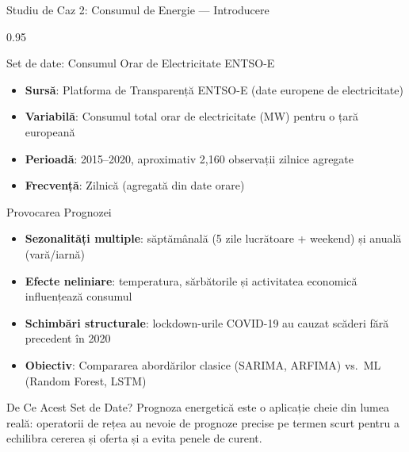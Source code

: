 \documentclass[9pt, aspectratio=169, t]{beamer}
\begin{document}
\begin{frame}{Studiu de Caz 2: Consumul de Energie --- Introducere}
    \begin{cminipage}{0.95\textwidth}
    \vspace{-2mm}
    \begin{block}{Set de date: Consumul Orar de Electricitate ENTSO-E}
        {\small
        \begin{itemize}\setlength{\itemsep}{1pt}
            \item \textbf{Sursă}: Platforma de Transparență ENTSO-E (date europene de electricitate)
            \item \textbf{Variabilă}: Consumul total orar de electricitate (MW) pentru o țară europeană
            \item \textbf{Perioadă}: 2015--2020, aproximativ 2{,}160 observații zilnice agregate
            \item \textbf{Frecvență}: Zilnică (agregată din date orare)
        \end{itemize}
        }
    \end{block}
    \vspace{-2mm}
    \begin{alertblock}{Provocarea Prognozei}
        {\small
        \begin{itemize}\setlength{\itemsep}{1pt}
            \item \textbf{Sezonalități multiple}: săptămânală (5 zile lucrătoare + weekend) și anuală (vară/iarnă)
            \item \textbf{Efecte neliniare}: temperatura, sărbătorile și activitatea economică influențează consumul
            \item \textbf{Schimbări structurale}: lockdown-urile COVID-19 au cauzat scăderi fără precedent în 2020
            \item \textbf{Obiectiv}: Compararea abordărilor clasice (SARIMA, ARFIMA) vs.\ ML (Random Forest, LSTM)
        \end{itemize}
        }
    \end{alertblock}
    \vspace{-2mm}
    \begin{exampleblock}{De Ce Acest Set de Date?}
        {\small Prognoza energetică este o aplicație cheie din lumea reală: operatorii de rețea au nevoie de prognoze precise pe termen scurt pentru a echilibra cererea și oferta și a evita penele de curent.}
    \end{exampleblock}
    \end{cminipage}
\end{frame}
\end{document}
